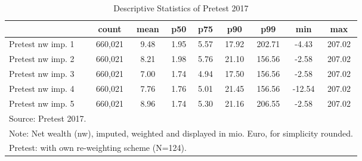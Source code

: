 \begin{table}[htbp]\centering
\def\sym#1{\ifmmode^{#1}\else\(^{#1}\)\fi}
\caption{Descriptive Statistics of Pretest 2017}
\begin{tabular}{l*{1}{cccccccc}}
\hline\hline
                                            &       count&        mean&         p50&         p75&         p90&         p99&         min&         max\\
\hline
Pretest nw imp. 1                           &     660,021&        9.48&        1.95&        5.57&       17.92&      202.71&       -4.43&      207.02\\
Pretest nw imp. 2                           &     660,021&        8.21&        1.98&        5.76&       21.10&      156.56&       -2.58&      207.02\\
Pretest nw imp. 3                           &     660,021&        7.00&        1.74&        4.94&       17.50&      156.56&       -2.58&      207.02\\
Pretest nw imp. 4                           &     660,021&        7.76&        1.76&        5.01&       21.45&      156.56&      -12.54&      207.02\\
Pretest nw imp. 5                           &     660,021&        8.96&        1.74&        5.30&       21.16&      206.55&       -2.58&      207.02\\
\hline\hline
\multicolumn{9}{l}{\footnotesize Source: Pretest 2017.}\\
\multicolumn{9}{l}{\footnotesize Note: Net wealth (nw), imputed, weighted and displayed in mio. Euro, for simplicity rounded.}\\
\multicolumn{9}{l}{\footnotesize Pretest: with own re-weighting scheme (N=124).}\\
\end{tabular}
\end{table}
